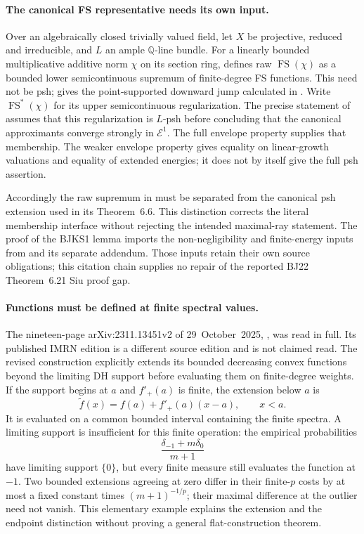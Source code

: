 \paragraph{The canonical FS representative needs its own input.}
Over an algebraically closed trivially valued field, let
\(X\) be projective, reduced and irreducible, and \(L\) an
ample \(\mathbb Q\)-line bundle. For a linearly bounded
multiplicative additive norm \(\chi\) on its section ring,
\cite[Definition~2.13]{BJKS1} defines raw
\(\operatorname{FS}(\chi)\) as a bounded lower semicontinuous
supremum of finite-degree FS functions. This need not be psh;
\cite[Example~2.21]{BJKS1} gives the point-supported downward
jump calculated in .
Write \(\operatorname{FS}^*(\chi)\) for its upper
semicontinuous regularization. The precise statement of
\cite[Lemma~6.17(iii)]{BJKS1} assumes that this regularization
is \(L\)-psh before concluding that the canonical
approximants converge strongly in \(\mathcal E^1\).
The full envelope property supplies that membership.
The weaker envelope property gives equality on linear-growth
valuations and equality of extended energies; it does not
by itself give the full psh assertion.

Accordingly the raw supremum in
\cite[equation~(6.15)]{Finski25SubmultiplicativePublished}
must be separated from the canonical psh extension used in
its Theorem~6.6. This distinction corrects the literal
membership interface without rejecting the intended maximal-ray
statement. The proof of the BJKS1 lemma imports the
non-negligibility and finite-energy inputs from \cite{BJ22}
and its separate addendum. Those inputs retain their own
source obligations; this citation chain supplies no repair
of the reported BJ22 Theorem~6.21 Siu proof gap.

\paragraph{Functions must be defined at finite spectral values.}
The nineteen-page arXiv:2311.13451v2 of 29~October~2025,
\cite{RWN25FlatsArxivV2}, was read in full. Its published IMRN
edition is a different source edition and is not claimed read.
The revised construction explicitly extends its bounded
decreasing convex functions beyond the limiting DH support
before evaluating them on finite-degree weights. If the support
begins at \(a\) and \(f'_+(a)\) is finite, the extension
below \(a\) is
\[
          \widetilde f(x)=f(a)+f'_+(a)(x-a),\qquad x<a.
\]
It is evaluated on a common bounded interval containing the
finite spectra. A limiting support is insufficient for this
finite operation: the empirical probabilities
\[
               \frac{\delta_{-1}+m\delta_0}{m+1}
\]
have limiting support \(\{0\}\), but every finite measure
still evaluates the function at \(-1\).
Two bounded extensions agreeing at zero differ in their
finite-\(p\) costs by at most a fixed constant times
\((m+1)^{-1/p}\); their maximal difference at the outlier
need not vanish. This elementary example explains the
extension and the endpoint distinction without proving a
general flat-construction theorem.


